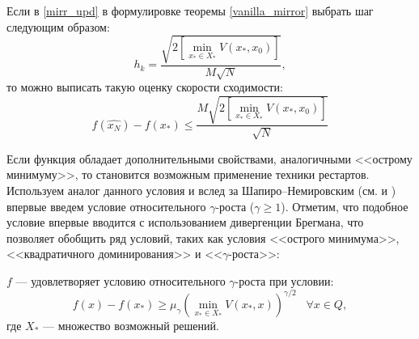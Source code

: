     \begin{remark}
        Если в \eqref{mirr_upd} в формулировке теоремы \ref{vanilla_mirror} выбрать шаг следующим образом:
        \begin{equation} \label{mirr_step}
            h_{k} = \frac{\sqrt{2 \left[\min\limits_{x_* \in X_*}{V(x_*, x_0)}\right] }}{M\sqrt{N}},
        \end{equation}
        то можно выписать такую оценку скорости сходимости:
        \begin{equation} \label{mirr_est}
            f(\widehat{x_N}) - f(x_*) \leq \frac{M\sqrt{2 \left[\min\limits_{x_* \in X_*}{V(x_*, x_0)}\right]}}{\sqrt{N}}
        \end{equation}
    \end{remark}
    Если функция обладает дополнительными свойствами, аналогичными <<острому минимуму>>,  то становится возможным применение техники рестартов. Используем аналог данного условия и вслед за Шапиро–Немировским (см. \cite{shapiro_2005} и \cite{shapiro_2021} ) впервые введем условие относительного $\gamma$-роста ($\gamma \geq 1$). Отметим, что подобное условие впервые вводится с использованием дивергенции Брегмана, что позволяет обобщить ряд условий, таких как условия <<острого минимума>>, <<квадратичного доминирования>> и <<$\gamma$-роста>>:
    \begin{definition}
       $f$ --- удовлетворяет условию относительного $\gamma$-роста при условии:
       \begin{equation} \label{gamma-growth}
           f(x) - f(x_*) \geq \mu_{\gamma}\left(\min_{x_* \in X_*}{V(x_*,x)}\right)^{\gamma/2} \;\;\; \forall x \in Q,
       \end{equation}
       где $X_*$ --- множество возможный решений.  
    \end{definition}
    
